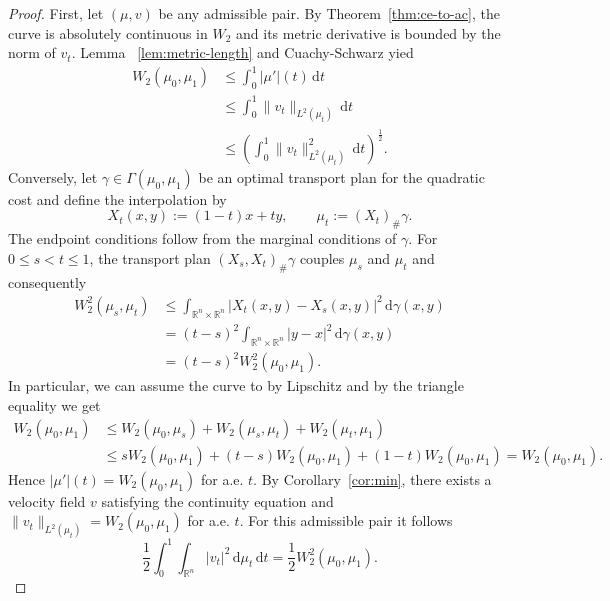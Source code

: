 \begin{proof}
	First, let $(\mu,v)$ be any admissible pair. By Theorem~\ref{thm:ce-to-ac}, the curve is absolutely continuous in $W_2$ and its metric derivative is bounded by the norm of $v_t$. Lemma ~\ref{lem:metric-length} and Cuachy-Schwarz yied
	\begin{align*}
		W_2(\mu_0,\mu_1) &\leq\int_0^1|\mu'|(t)\,\mathrm dt\\
						 &\leq\int_0^1 \lVert v_t\rVert_{L^2(\mu_t)}\,\mathrm dt\\
						 &\leq\left(\int_0^1 \lVert v_t\rVert_{L^2(\mu_t)}^2\,\mathrm dt\right)^{\frac{1}{2}}.
	\end{align*}
	Conversely, let $\gamma\in\Gamma(\mu_0,\mu_1)$ be an optimal transport plan for the quadratic cost and define the interpolation by
	$$
	X_t(x,y):=(1-t)x+ty,\qquad \mu_t:=(X_t)_\#\gamma.
	$$
	The endpoint conditions follow from the marginal conditions of $\gamma$. For $0\leq s<t\leq 1$, the transport plan $(X_s,X_t)_\#\gamma$ couples $\mu_s$ and $\mu_t$ and consequently
	\begin{align*}
		W_2^2(\mu_s,\mu_t) &\leq\int_{\mathbb{R}^n\times \mathbb{R}^n}|X_t(x,y)-X_s(x,y)|^2\,\mathrm d\gamma(x,y)\\
						   &=(t-s)^2\int_{\mathbb{R}^n \times \mathbb{R}^n}|y-x|^2\,\mathrm d\gamma(x,y)\\
						   &=(t-s)^2W_2^2(\mu_0,\mu_1).
	\end{align*}
	In particular, we can assume the curve to by Lipschitz and by the triangle equality we get
	\begin{align*}
	W_2(\mu_0,\mu_1)&\leq W_2(\mu_0,\mu_s)+W_2(\mu_s,\mu_t)+W_2(\mu_t,\mu_1)\\&\leq sW_2(\mu_0,\mu_1) + (t-s)W_2(\mu_0,\mu_1)+(1-t)W_2(\mu_0,\mu_1) = W_2(\mu_0,\mu_1). 
\end{align*}
Hence $|\mu'|(t)= W_2(\mu_0,\mu_1)$ for a.e. $t$. By Corollary~\ref{cor:min}, there exists a velocity field $v$ satisfying the continuity equation and $\lVert v_t\rVert_{L^2(\mu_t)}=W_2(\mu_0,\mu_1)$ for a.e. $t$. For this admissible pair it follows
$$
\frac{1}{2}\int_0^1\int_{\mathbb{R}^n}|v_t|^2\,\mathrm d\mu_t\,\mathrm dt = \frac{1}{2} W_2^2(\mu_0,\mu_1).
$$
\end{proof}

\newpage
\newpage


